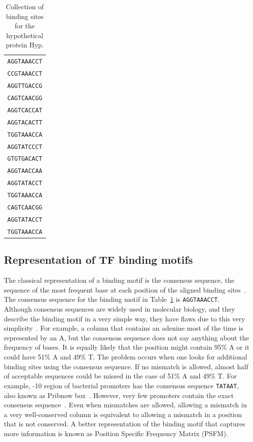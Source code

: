 \begin{table}[h]
  \centering
  \caption{Collection of binding sites for the hypothetical protein Hyp.}
  \label{tab:lexa-motif}
  \begin{tabular}{c}
\texttt{AGGTAAACCT}\\
\texttt{CCGTAAACCT}\\
\texttt{AGGTTGACCG}\\
\texttt{CAGTCAACGG}\\
\texttt{AGGTCACCAT}\\
\texttt{AGGTACACTT}\\
\texttt{TGGTAAACCA}\\
\texttt{AGGTATCCCT}\\
\texttt{GTGTGACACT}\\
\texttt{AGGTAACCAA}\\
\texttt{AGGTATACCT}\\
\texttt{TGGTAAACCA}\\
\texttt{CAGTCAACGG}\\
\texttt{AGGTATACCT}\\
\texttt{TGGTAAACCA}
   \end{tabular}
\end{table}


\subsection{Representation of TF binding motifs}

The classical representation of a binding motif is the consensus sequence, the
sequence of the most frequent base at each position of the aligned binding
sites~\cite{pierce2012genetics}. The consensus sequence for the binding motif
in Table~\ref{tab:lexa-motif} is \texttt{AGGTAAACCT}. Although consensus
sequences are widely used in molecular biology, and they describe the binding
motif in a very simple way, they have flaws due to this very
simplicity~\cite{schneider2002consensus}. For example, a column that contains
an adenine most of the time is represented by an A, but the consensus sequence
does not say anything about the frequency of bases. It is equally likely that
the position might contain 95\% A or it could have 51\% A and 49\% T. The
problem occurs when one looks for additional binding sites using the consensus
sequence.  If no mismatch is allowed, almost half of acceptable sequences could
be missed in the case of 51\% A and 49\% T. For example, -10 region of
bacterial promoters has the consensus sequence \texttt{TATAAT}, also known as
Pribnow box~\cite{pribnow1975nucleotide}. However,  very few promoters
contain the exact consensus sequence~\cite{lisser1993compilation}. Even when
mismatches are allowed, allowing a mismatch in a very well-conserved column
is equivalent to allowing a mismatch in a position that is not
conserved. A better representation of the binding motif that captures more
information is known as Position Specific Frequency Matrix (PSFM).


